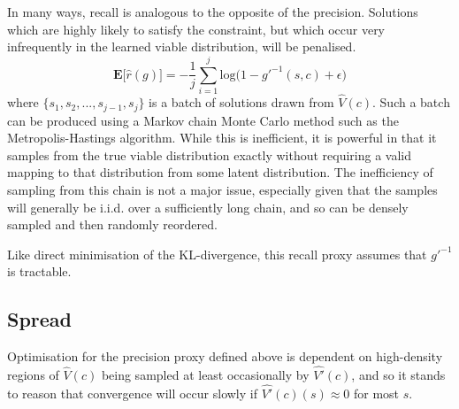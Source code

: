 \documentclass[../../main.tex]{subfiles}
\begin{document}
In many ways, recall is analogous to the opposite of the precision.
Solutions which are highly likely to satisfy the constraint, but which occur very infrequently in the learned viable distribution, will be penalised.
$$\textbf{E}\big[\hat{r}(g)\big]=-\frac{1}{j}\sum_{i=1}^{j}\text{log}\big(1-g'^{-1}(s,c)+\epsilon\big)$$
where $\{s_1,s_2,...,s_{j-1},s_j\}$ is a batch of solutions drawn from $\hat{V}(c)$.
Such a batch can be produced using a Markov chain Monte Carlo method such as the Metropolis-Hastings algorithm.
While this is inefficient, it is powerful in that it samples from the true viable distribution exactly without requiring a valid mapping to that distribution from some latent distribution.
The inefficiency of sampling from this chain is not a major issue, especially given that the samples will generally be i.i.d. over a sufficiently long chain, and so can be densely sampled and then randomly reordered.

Like direct minimisation of the KL-divergence, this recall proxy assumes that $g'^{-1}$ is tractable.

\subsection{Spread} \label{subsection:spread}

Optimisation for the precision proxy defined above is dependent on high-density regions of $\hat{V}(c)$ being sampled at least occasionally by $\hat{V'}(c)$, and so it stands to reason that convergence will occur slowly if $\hat{V'}(c)(s)\approx 0$ for most $s$.
\end{document}
